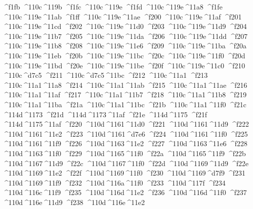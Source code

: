 \checkit ^^^^f1fb ^^^^110c^^^^119b
\checkit ^^^^f1fc ^^^^110c^^^^119e
\checkit ^^^^f1fd ^^^^110c^^^^119e^^^^11a8
\checkit ^^^^f1fe ^^^^110c^^^^119e^^^^11ab
\checkit ^^^^f1ff ^^^^110c^^^^119e^^^^11ae
\checkit ^^^^f200 ^^^^110c^^^^119e^^^^11af
\checkit ^^^^f201 ^^^^110c^^^^119e^^^^11cd
\checkit ^^^^f202 ^^^^110c^^^^119e^^^^11d0
\checkit ^^^^f203 ^^^^110c^^^^119e^^^^11d9
\checkit ^^^^f204 ^^^^110c^^^^119e^^^^11b7
\checkit ^^^^f205 ^^^^110c^^^^119e^^^^11da
\checkit ^^^^f206 ^^^^110c^^^^119e^^^^11dd
\checkit ^^^^f207 ^^^^110c^^^^119e^^^^11b8
\checkit ^^^^f208 ^^^^110c^^^^119e^^^^11e6
\checkit ^^^^f209 ^^^^110c^^^^119e^^^^11ba
\checkit ^^^^f20a ^^^^110c^^^^119e^^^^11eb
\checkit ^^^^f20b ^^^^110c^^^^119e^^^^11bc
\checkit ^^^^f20c ^^^^110c^^^^119e^^^^11f0
\checkit ^^^^f20d ^^^^110c^^^^119e^^^^11bd
\checkit ^^^^f20e ^^^^110c^^^^119e^^^^11be
\checkit ^^^^f20f ^^^^110c^^^^119e^^^^11c0
\checkit ^^^^f210 ^^^^110c^^^^d7c5
\checkit ^^^^f211 ^^^^110c^^^^d7c5^^^^11bc
\checkit ^^^^f212 ^^^^110c^^^^11a1
\checkit ^^^^f213 ^^^^110c^^^^11a1^^^^11a8
\checkit ^^^^f214 ^^^^110c^^^^11a1^^^^11ab
\checkit ^^^^f215 ^^^^110c^^^^11a1^^^^11ae
\checkit ^^^^f216 ^^^^110c^^^^11a1^^^^11af
\checkit ^^^^f217 ^^^^110c^^^^11a1^^^^11b7
\checkit ^^^^f218 ^^^^110c^^^^11a1^^^^11b8
\checkit ^^^^f219 ^^^^110c^^^^11a1^^^^11ba
\checkit ^^^^f21a ^^^^110c^^^^11a1^^^^11bc
\checkit ^^^^f21b ^^^^110c^^^^11a1^^^^11f0
\checkit ^^^^f21c ^^^^114d^^^^1173
\checkit ^^^^f21d ^^^^114d^^^^1173^^^^11af
\checkit ^^^^f21e ^^^^114d^^^^1175
\checkit ^^^^f21f ^^^^114d^^^^1175^^^^11af
\checkit ^^^^f220 ^^^^110d^^^^1161^^^^11d0
\checkit ^^^^f221 ^^^^110d^^^^1161^^^^11d9
\checkit ^^^^f222 ^^^^110d^^^^1161^^^^11e2
\checkit ^^^^f223 ^^^^110d^^^^1161^^^^d7e6
\checkit ^^^^f224 ^^^^110d^^^^1161^^^^11f0
\checkit ^^^^f225 ^^^^110d^^^^1161^^^^11f9
\checkit ^^^^f226 ^^^^110d^^^^1163^^^^11e2
\checkit ^^^^f227 ^^^^110d^^^^1163^^^^11e6
\checkit ^^^^f228 ^^^^110d^^^^1163^^^^11f0
\checkit ^^^^f229 ^^^^110d^^^^1165^^^^11f0
\checkit ^^^^f22a ^^^^110d^^^^1165^^^^11f9
\checkit ^^^^f22b ^^^^110d^^^^1167^^^^11d9
\checkit ^^^^f22c ^^^^110d^^^^1167^^^^11f0
\checkit ^^^^f22d ^^^^110d^^^^1169^^^^11d9
\checkit ^^^^f22e ^^^^110d^^^^1169^^^^11e2
\checkit ^^^^f22f ^^^^110d^^^^1169^^^^11f0
\checkit ^^^^f230 ^^^^110d^^^^1169^^^^d7f9
\checkit ^^^^f231 ^^^^110d^^^^1169^^^^11f9
\checkit ^^^^f232 ^^^^110d^^^^116a^^^^11f0
\checkit ^^^^f233 ^^^^110d^^^^117f
\checkit ^^^^f234 ^^^^110d^^^^116c^^^^11f9
\checkit ^^^^f235 ^^^^110d^^^^116d^^^^11e2
\checkit ^^^^f236 ^^^^110d^^^^116d^^^^11f0
\checkit ^^^^f237 ^^^^110d^^^^116e^^^^11d9
\checkit ^^^^f238 ^^^^110d^^^^116e^^^^11e2
